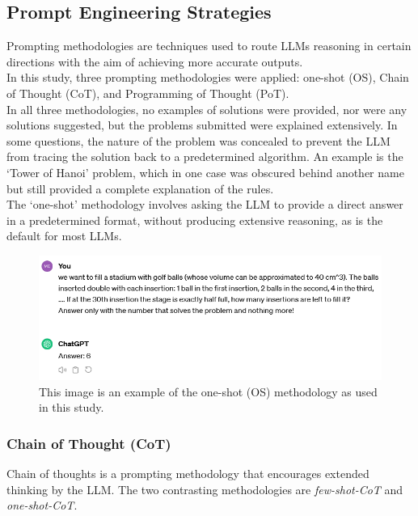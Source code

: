 \documentclass[12pt]{article}
\begin{document}
    \subsection{Prompt Engineering Strategies}
    Prompting methodologies are techniques used to route LLMs reasoning in certain directions with the aim of achieving more accurate outputs.\\
    In this study, three prompting methodologies were applied: one-shot (OS), Chain of Thought (CoT), and Programming of Thought (PoT).\\
In all three methodologies, no examples of solutions were provided, nor were any solutions suggested, but the problems submitted were explained extensively. In some questions, the nature of the problem was concealed to prevent the LLM from tracing the solution back to a predetermined algorithm. An example is the ‘Tower of Hanoi’ problem, which in one case was obscured behind another name but still provided a complete explanation of the rules.\\
The ‘one-shot’ methodology involves asking the LLM to provide a direct answer in a predetermined format, without producing extensive reasoning, as is the default for most LLMs.\\
    \begin{figure}[H]
    \centering
            \includegraphics[width=1\textwidth]{MyOneShot.png}
    \caption[Example of one-shot methodology as used]{This image is an example of the one-shot (OS) methodology as used in this study.}
    \end{figure} 
    
    \subsubsection{Chain of Thought (CoT)}
    Chain of thoughts is a prompting methodology that encourages extended thinking by the LLM.
The two contrasting methodologies are \textit{few-shot-CoT} and \textit{one-shot-CoT}.
    
\end{document}
